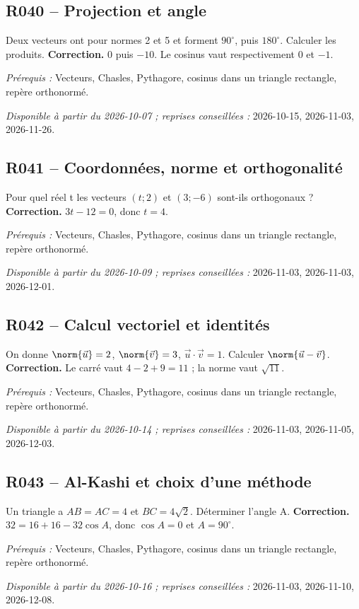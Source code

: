 \subsection*{R040 -- Projection et angle}\label{R040}
Deux vecteurs ont pour normes 2 et 5 et forment $90^\circ$, puis $180^\circ$. Calculer les produits.
\ifprof\textbf{Correction.} $0$ puis $-10$. Le cosinus vaut respectivement 0 et $-1$.\par\textit{Prérequis :} Vecteurs, Chasles, Pythagore, cosinus dans un triangle rectangle, repère orthonormé.\par\textit{Disponible à partir du 2026-10-07 ; reprises conseillées :} 2026-10-15, 2026-11-03, 2026-11-26.\fi
{}\subsection*{R041 -- Coordonnées, norme et orthogonalité}\label{R041}
Pour quel réel t les vecteurs $(t;2)$ et $(3;-6)$ sont-ils orthogonaux ?
\ifprof\textbf{Correction.} $3t-12=0$, donc $t=4$.\par\textit{Prérequis :} Vecteurs, Chasles, Pythagore, cosinus dans un triangle rectangle, repère orthonormé.\par\textit{Disponible à partir du 2026-10-09 ; reprises conseillées :} 2026-11-03, 2026-11-03, 2026-12-01.\fi
{}\subsection*{R042 -- Calcul vectoriel et identités}\label{R042}
On donne $\norm{\vec u}=2$, $\norm{\vec v}=3$, $\vec u\cdot\vec v=1$. Calculer $\norm{\vec u-\vec v}$.
\ifprof\textbf{Correction.} Le carré vaut $4-2+9=11$ ; la norme vaut $\sqrt{11}$.\par\textit{Prérequis :} Vecteurs, Chasles, Pythagore, cosinus dans un triangle rectangle, repère orthonormé.\par\textit{Disponible à partir du 2026-10-14 ; reprises conseillées :} 2026-11-03, 2026-11-05, 2026-12-03.\fi
{}\subsection*{R043 -- Al-Kashi et choix d’une méthode}\label{R043}
Un triangle a $AB=AC=4$ et $BC=4\sqrt2$. Déterminer l’angle A.
\ifprof\textbf{Correction.} $32=16+16-32\cos A$, donc $\cos A=0$ et $A=90^\circ$.\par\textit{Prérequis :} Vecteurs, Chasles, Pythagore, cosinus dans un triangle rectangle, repère orthonormé.\par\textit{Disponible à partir du 2026-10-16 ; reprises conseillées :} 2026-11-03, 2026-11-10, 2026-12-08.\fi
